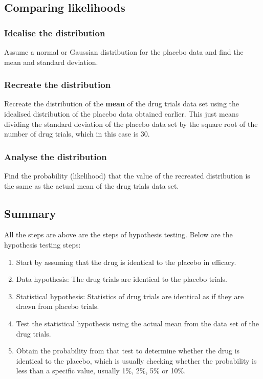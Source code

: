 \documentclass[11pt]{article}
\begin{document}
\subsection{Comparing likelihoods}
\label{sec:orga473079}

\subsubsection{Idealise the distribution}
\label{sec:org3991601}
Assume a normal or Gaussian distribution for the placebo data and find the mean and standard deviation.

\subsubsection{Recreate the distribution}
\label{sec:org272e2c9}
Recreate the distribution of the \textbf{mean} of the drug trials data set using the idealised distribution of the placebo data obtained earlier. This just means dividing the standard deviation of the placebo data set by the square root of the number of drug trials, which in this case is 30.

\subsubsection{Analyse the distribution}
\label{sec:org733b4b4}
Find the probability (likelihood) that the value of the recreated distribution is the same as the actual mean of the drug trials data set.

\subsection{Summary}
\label{sec:orgc5f8392}
All the steps are above are the steps of hypothesis testing. Below are the hypothesis testing steps:

\begin{enumerate}
\item Start by assuming that the drug is identical to the placebo in efficacy.
\item Data hypothesis: The drug trials are identical to the placebo trials.
\item Statistical hypothesis: Statistics of drug trials are identical as if they are drawn from placebo trials.
\item Test the statistical hypothesis using the actual mean from the data set of the drug trials.
\item Obtain the probability from that test to determine whether the drug is identical to the placebo, which is usually checking whether the probability is less than a specific value, usually 1\%, 2\%, 5\% or 10\%.
\end{enumerate}
\end{document}
